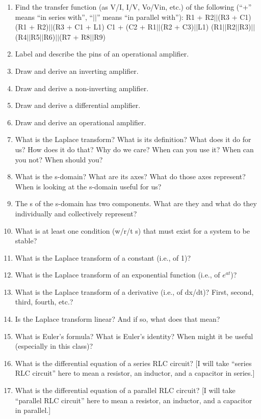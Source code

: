\documentclass[11pt]{book}
\begin{document}
\begin{enumerate}
	\item Find the transfer function (as V/I, I/V, Vo/Vin, etc.) of the following (``+'' means ``in series with'', ``$\vert\vert$'' means “in parallel with''):
	\subitem R1 + R2$\vert\vert$(R3 + C1)
	\subitem (R1 + R2)$\vert\vert$(R3 + C1 + L1)
	\subitem C1 + (C2 + R1$\vert\vert$(R2 + C3)$\vert\vert$L1)
	\subitem (R1$\vert\vert$R2$\vert\vert$R3)$\vert\vert$(R4$\vert\vert$R5$\vert\vert$R6)$\vert\vert$(R7 + R8$\vert\vert$R9)
	\item Label and describe the pins of an operational amplifier.
	\item Draw and derive an inverting amplifier.
	\item Draw and derive a non-inverting amplifier.
	\item Draw and derive a differential amplifier.
	\item Draw and derive an operational amplifier.
	\item What is the Laplace transform? What is its definition? What does it do for us? How does it do that? Why do we care? When can you use it? When can you not? When should you?
	\item What is the s-domain? What are its axes? What do those axes represent? When is looking at the s-domain useful for us?
	\item The s of the s-domain has two components. What are they and what do they individually and collectively represent?
	\item What is at least one condition (w/r/t s) that must exist for a system to be stable? 
	\item What is the Laplace transform of a constant (i.e., of 1)?
	\item What is the Laplace transform of an exponential function (i.e., of $e^{at}$)?
	\item What is the Laplace transform of a derivative (i.e., of dx/dt)? First, second, third, fourth, etc.?
	\item Is the Laplace transform linear? And if so, what does that mean?
	\item What is Euler’s formula? What is Euler’s identity? When might it be useful (especially in this class)?
	\item What is the differential equation of a series RLC circuit? [I will take “series RLC circuit” here to mean a resistor, an inductor, and a capacitor in series.]
	\item What is the differential equation of a parallel RLC circuit? [I will take “parallel RLC circuit” here to mean a resistor, an inductor, and a capacitor in parallel.]

\end{enumerate}
\end{document}
